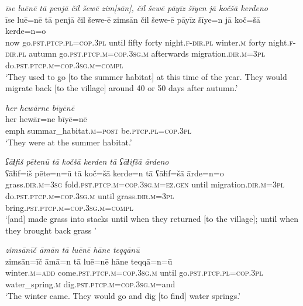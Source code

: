 \ea \label{ŽE.9}
\textit{īse luēnē tā penjā čil šewē zim[sān], čil šewē pāyīz šīyen jā kočšā kerdeno} \\ 
\gll īse luē=nē tā penjā čil šewe-ē zimsān čil šewe-ē pāyīz šīye=n jā koč=šā kerde=n=o \\ 
 now go\textsc{.pst}\textsc{.ptcp}\textsc{.pl}\textsc{=cop}\textsc{.3pl} until fifty forty night\textsc{.f}\textsc{-dir}\textsc{.pl} winter\textsc{.m} forty night\textsc{.f}\textsc{-dir}\textsc{.pl} autumn go\textsc{.pst}\textsc{.ptcp}\textsc{.m}\textsc{=cop}\textsc{.3sg}\textsc{.m} afterwards migration\textsc{.dir}\textsc{.m}\textsc{=3pl} do\textsc{.pst}\textsc{.ptcp}\textsc{.m}\textsc{=cop}\textsc{.3sg}\textsc{.m}\textsc{=compl} \\ 
\glt `They used to go [to the summer habitat] at this time of the year. They would migrate back [to the village] around 40 or 50 days after autumn.'
\z 
 
\ea \label{ŽE.10}
\textit{her hewārne bīyēnē} \\ 
\gll her hewār=ne bīyē=nē \\ 
 emph summar\_habitat\textsc{.m}\textsc{=\textsc{post}} be\textsc{.ptcp}\textsc{.pl}\textsc{=cop}\textsc{.3pl} \\ 
\glt `They were at the summer habitat.'
\z 
 
\ea \label{ŽE.13}
\textit{ʕāɫfiš pētenū tā kočšā kerden tā ʕāɫifšā ārdeno} \\ 
\gll ʕāɫif=iš pēte=n=ū tā koč=šā kerde=n tā ʕāɫif=šā ārde=n=o \\ 
 grass\textsc{.dir}\textsc{.m}\textsc{=3sg} fold\textsc{.pst}\textsc{.ptcp}\textsc{.m}\textsc{=cop}\textsc{.3sg}\textsc{.m}\textsc{\textsc{=ez.gen}} until migration\textsc{.dir}\textsc{.m}\textsc{=3pl} do\textsc{.pst}\textsc{.ptcp}\textsc{.m}\textsc{=cop}\textsc{.3sg}\textsc{.m} until grass\textsc{.dir}\textsc{.m}\textsc{=3pl} bring\textsc{.pst}\textsc{.ptcp}\textsc{.m}\textsc{=cop}\textsc{.3sg}\textsc{.m}\textsc{=compl} \\ 
\glt `[and] made grass into stacks until when they returned [to the village]; until when they brought back grass '
\z 
 
\ea \label{ŽE.15}
\textit{zimsānīč āmān tā luēnē hāne teqqānū} \\ 
\gll zimsān=īč āmā=n tā luē=nē hāne teqqā=n=ū \\ 
 winter\textsc{.m}\textsc{=add} come\textsc{.pst}\textsc{.ptcp}\textsc{.m}\textsc{=cop}\textsc{.3sg}\textsc{.m} until go\textsc{.pst}\textsc{.ptcp}\textsc{.pl}\textsc{=cop}\textsc{.3pl} water\_spring\textsc{.m} dig\textsc{.pst}\textsc{.ptcp}\textsc{.m}\textsc{=cop}\textsc{.3sg}\textsc{.m}=and \\ 
\glt `The winter came. They would go and dig [to find] water springs.'
\z 
 
